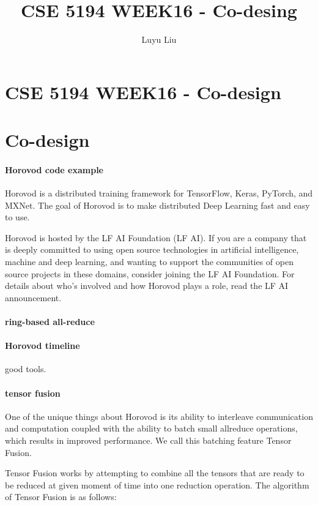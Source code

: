 \documentclass[12pt]{article}
\begin{document}
\author{Luyu Liu}

\newcommand\para{\par\refstepcounter{para}\thepara\space}

\section*{CSE 5194 WEEK16 - Co-design}
\title{CSE 5194 WEEK16 - Co-desing}

\section{Co-design}
\paragraph{Horovod code example}
Horovod is a distributed training framework for TensorFlow, Keras, PyTorch, and MXNet. The goal of Horovod is to make distributed Deep Learning fast and easy to use.

Horovod is hosted by the LF AI Foundation (LF AI). If you are a company that is deeply committed to using open source technologies in artificial intelligence, machine and deep learning, and wanting to support the communities of open source projects in these domains, consider joining the LF AI Foundation. For details about who's involved and how Horovod plays a role, read the LF AI announcement.

\paragraph{ring-based all-reduce}

\paragraph{Horovod timeline}
good tools.

\paragraph{tensor fusion}
One of the unique things about Horovod is its ability to interleave communication and computation coupled with the ability to batch small allreduce operations, which results in improved performance. We call this batching feature Tensor Fusion.

Tensor Fusion works by attempting to combine all the tensors that are ready to be reduced at given moment of time into one reduction operation. The algorithm of Tensor Fusion is as follows:
\end{document}
